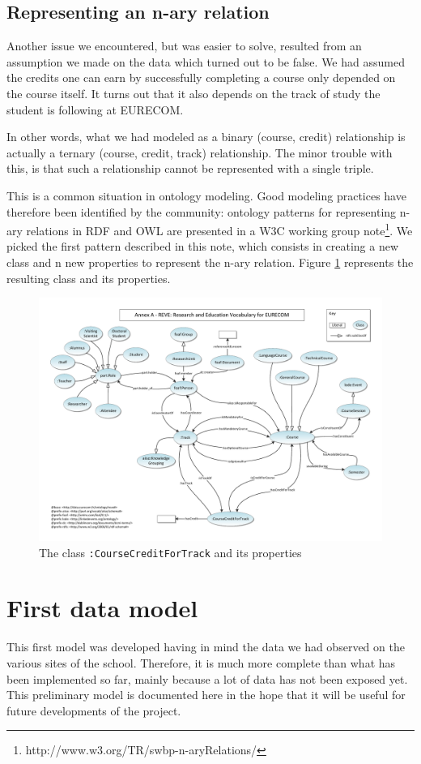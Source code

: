 \documentclass[a4paper,11pt]{report}
\begin{document}
\subsection{Representing an n-ary relation}
Another issue we encountered, but was easier to solve, resulted from an assumption we made on the data which turned out to be false. We had assumed the credits one can earn by successfully completing a course only depended on the course itself. It turns out that it also depends on the track of study the student is following at \mbox{EURECOM}. 

In other words, what we had modeled as a binary (course, credit) relationship is actually a ternary (course, credit, track) relationship. The minor trouble with this, is that such a relationship cannot be represented with a single triple. 

This is a common situation in ontology modeling. Good modeling practices have therefore been identified by the community: ontology patterns for representing n-ary relations in RDF and OWL are presented in a W3C working group note\footnote{http://www.w3.org/TR/swbp-n-aryRelations/}. We picked the first pattern described in this note, which consists in creating a new class and n new properties to represent the n-ary relation. Figure \ref{fig:nary} represents the resulting class and its properties. 
\begin{figure}[htbp] 
\centering
\includegraphics[page=5]{graphs.pdf}
\caption{The class {\texttt{:CourseCreditForTrack}} and its properties}
\label{fig:nary}
\end{figure}

\section{First data model} \label{sec:1stdatamodel}
This first model was developed having in mind the data we had observed on the various sites of the school. Therefore, it is much more complete than what has been implemented so far, mainly because a lot of data has not been exposed yet. This preliminary model is documented here in the hope that it will be useful for future developments of the project. 
\end{document}
